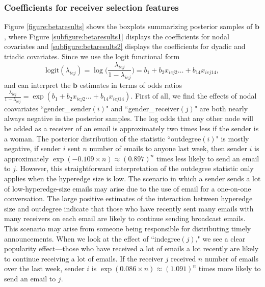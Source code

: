 \documentclass[ba]{imsart}
\numberwithin{equation}{section}
\theoremstyle{plain}
\begin{document}
	\subsubsection{Coefficients for receiver selection features}
	Figure \ref{figure:betaresults} shows the boxplots summarizing posterior samples of $\boldsymbol{b}$, where Figure \ref{subfigure:betaresults1} displays the coefficients for nodal covariates and \ref{subfigure:betaresults2} displays the coefficients for dyadic and triadic covariates. Since we use the logit functional form 
	\begin{equation*}
		\mbox{logit}(\lambda_{iej})=\log\Big(\frac{\lambda_{iej}}{1-\lambda_{iej}}\Big) =b_{1}+b_{2} x_{iej2}\ldots+b_{14}x_{iej14},
	\end{equation*}
	and can interpret the $\boldsymbol{b}$ estimates in terms of odds ratios $\frac{\lambda_{iej}}{1-\lambda_{iej}}=\exp(b_{1}+b_{2} x_{iej2}\ldots+b_{14}x_{iej14})$. First of all, we find the effects of nodal coavariates ``gender\_\,sender$(i)$" and ``gender\_\,receiver$(j)$" are both nearly always negative in the posterior samples. The log odds that any other node will be added as a receiver of an email is approximately two times less if the sender is a woman. The posterior distribution of the statistic ``outdegree$(i)$" is mostly negative, if sender $i$ sent $n$ number of emails to anyone last week, then sender $i$ is approximately $\exp(-0.109\times n)\approx(0.897)^n$ times less likely to send an email to $j$. However, this straightforward interpretation of the outdegree statistic only applies when the hyperedge size is low. The scenario in which a sender sends a lot of low-hyperedge-size emails may arise due to the use of email for a one-on-one conversation. The large positive estimates of the interaction between hyperedge size and outdegree indicate that those who have recently sent many emails with many receivers on each email are likely to continue sending broadcast emails. This scenario may arise from someone being responsible for distributing timely announcements. When we look at the effect of ``indegree$(j)$," we see a clear popularity effect---those who have received a lot of emails a lot recently are likely to continue receiving a lot of emails. If the receiver $j$ received $n$ number of emails over the last week, sender $i$ is $\exp(0.086\times n)\approx(1.091)^n $ times more likely to send an email to $j$. 
\end{document}
